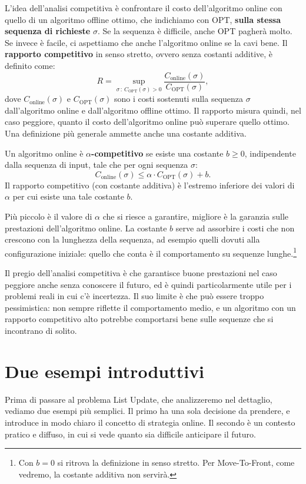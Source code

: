 L'idea dell'analisi competitiva è confrontare il costo dell'algoritmo online con quello di un algoritmo offline ottimo, che indichiamo con OPT, \textbf{sulla stessa sequenza di richieste} $\sigma$. Se la sequenza è difficile, anche OPT pagherà molto. Se invece è facile, ci aspettiamo che anche l'algoritmo online se la cavi bene. Il \textbf{rapporto competitivo} in senso stretto, ovvero senza costanti additive, è definito come:
\[
R = \sup_{\sigma\,:\,C_{\mathrm{OPT}}(\sigma) > 0} \frac{C_{\mathrm{online}}(\sigma)}{C_{\mathrm{OPT}}(\sigma)},
\]
dove $C_{\mathrm{online}}(\sigma)$ e $C_{\mathrm{OPT}}(\sigma)$ sono i costi sostenuti sulla sequenza $\sigma$ dall'algoritmo online e dall'algoritmo offline ottimo. Il rapporto misura quindi, nel caso peggiore, quanto il costo dell'algoritmo online può superare quello ottimo. Una definizione più generale ammette anche una costante additiva.

\begin{definizione}\label{def:competitivo}
Un algoritmo online è \textbf{$\alpha$-competitivo} se esiste una costante $b \ge 0$, indipendente dalla sequenza di input, tale che per ogni sequenza $\sigma$:
\[
C_{\mathrm{online}}(\sigma) \le \alpha \cdot C_{\mathrm{OPT}}(\sigma) + b.
\]
Il rapporto competitivo (con costante additiva) è l'estremo inferiore dei valori di $\alpha$ per cui esiste una tale costante $b$.
\end{definizione}

Più piccolo è il valore di $\alpha$ che si riesce a garantire, migliore è la garanzia sulle prestazioni dell'algoritmo online. La costante $b$ serve ad assorbire i costi che non crescono con la lunghezza della sequenza, ad esempio quelli dovuti alla configurazione iniziale: quello che conta è il comportamento su sequenze lunghe.\footnote{Con $b = 0$ si ritrova la definizione in senso stretto. Per Move-To-Front, come vedremo, la costante additiva non servirà.}

Il pregio dell'analisi competitiva è che garantisce buone prestazioni nel caso peggiore anche senza conoscere il futuro, ed è quindi particolarmente utile per i problemi reali in cui c'è incertezza. Il suo limite è che può essere troppo pessimistica: non sempre riflette il comportamento medio, e un algoritmo con un rapporto competitivo alto potrebbe comportarsi bene sulle sequenze che si incontrano di solito.

\section{Due esempi introduttivi}\label{sec:online-esempi}
Prima di passare al problema List Update, che analizzeremo nel dettaglio, vediamo due esempi più semplici. Il primo ha una sola decisione da prendere, e introduce in modo chiaro il concetto di strategia online. Il secondo è un contesto pratico e diffuso, in cui si vede quanto sia difficile anticipare il futuro.

